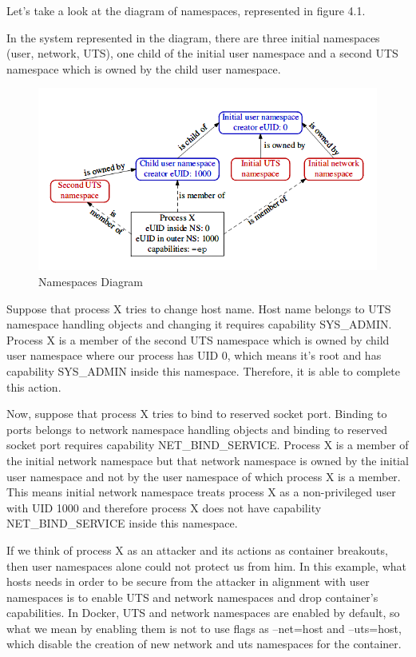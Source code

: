 Let's take a look at the diagram of namespaces, represented in figure 4.1. \cite{diagramuserns}

In the system represented in the diagram, there are three initial namespaces (user, network, UTS), one child of the initial user namespace and a second UTS namespace which is owned by the child user namespace.

\begin{figure}[h!]
  \centering
   \includegraphics[width=0.9\linewidth]{../figures/userns1gm.png}
   \caption{Namespaces Diagram}
\end{figure}
\hfill\break\hfill\break

Suppose that process X tries to change host name. Host name belongs to UTS namespace handling objects and changing it requires capability SYS\_ADMIN. Process X is a member of the second UTS namespace which is owned by child user namespace where our process has UID 0, which means it's root and has capability SYS\_ADMIN inside this namespace. Therefore, it is able to complete this action.

Now, suppose that process X tries to bind to reserved socket port. Binding to ports belongs to network namespace handling objects and binding to reserved socket port requires capability NET\_BIND\_SERVICE. Process X is a member of the initial network namespace but that network namespace is owned by the initial user namespace and not by the user namespace of which process X is a member. This means initial network namespace treats process X as a non-privileged user with UID 1000 and therefore process X does not have capability NET\_BIND\_SERVICE inside this namespace.

If we think of process X as an attacker and its actions as container breakouts, then user namespaces alone could not protect us from him. In this example, what hosts needs in order to be secure from the attacker in alignment with user namespaces is to enable UTS and network namespaces and drop container's capabilities. In Docker, UTS and network namespaces are enabled by default, so what we mean by enabling them is not to use flags as --net=host and --uts=host, which disable the creation of new network and uts namespaces for the container. 

